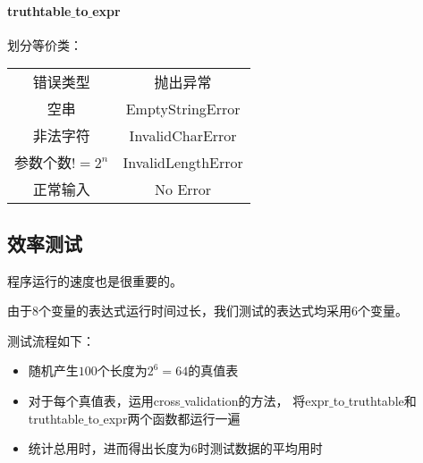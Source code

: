 	\paragraph{truthtable$\_$to$\_$expr\\}
		划分等价类：
		\begin{center}
			\begin{tabular}{cc}
				错误类型 & 抛出异常\\
				空串 & EmptyStringError\\
				非法字符 & InvalidCharError\\
				参数个数$!=2^n$ & InvalidLengthError\\
				正常输入 & No Error\\
		\end{tabular}				
		\end{center}

			
\subsection{效率测试}
	程序运行的速度也是很重要的。
	
	由于8个变量的表达式运行时间过长，我们测试的表达式均采用6个变量。
	
	测试流程如下：
		\begin{itemize}
			\item	随机产生$100$个长度为$2 ^ 6 = 64$的真值表
			\item	对于每个真值表，运用cross$\_$validation的方法，
					将expr$\_$to$\_$truthtable和truthtable$\_$to$\_$expr两个函数都运行一遍
			\item	统计总用时，进而得出长度为$6$时测试数据的平均用时
		\end{itemize}

		
